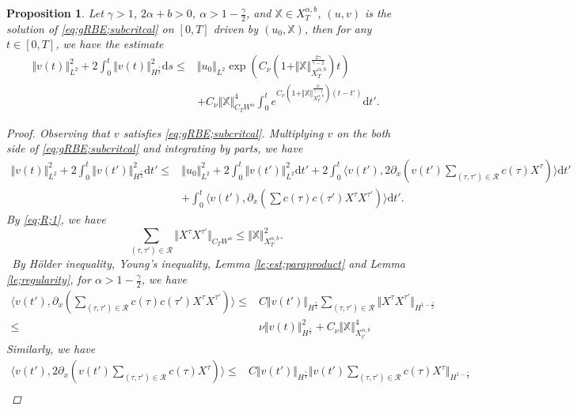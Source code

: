 \documentclass{article}
\newtheorem{proposition}{Proposition}[section]
\numberwithin{equation}{section}
\newcommand{\m}{\mathbb}
\newcommand{\ml}{\mathcal}
\newcommand{\p}{\partial}
\begin{document}
\begin{proposition}
    Let  $\gamma>1$,  $2\alpha+b>0$, $\alpha>1-\frac{\gamma}{2}$, and $\m X\in X_T^{\alpha,b} $, $(u,v)$ is the solution of \eqref{eq;gRBE;subcritcal} on $[0,T]$ driven by $(u_0,\m X)$, then for any $t\in[0,T]$, we have the estimate
\begin{align*}
    \Vert v(t)\Vert_{L^2}^2+2\int_0^t\Vert v(t)\Vert_{H^{\frac{\gamma}{2}}}^2\mathrm ds\leq& \Vert u_0\Vert_{L^2}\exp({C_\nu(1+\Vert \m X\Vert_{X_T^{\alpha,b}}^{\frac{2\gamma}{\gamma-1}})t})\\
    &+C_\nu\Vert \m X\Vert_{C_{ T}W^\alpha}^4\int_0^t e^{C_\nu(1+\Vert \m X\Vert_{X_T^{\alpha,b}}^{\frac{2\gamma}{\gamma-1}})(t-t')} \mathrm{d}t'.
\end{align*}
    \begin{proof}
        Observing that $v$ satisfies \eqref{eq;gRBE;subcritcal}. Multiplying $v$ on the both side of \eqref{eq;gRBE;subcritcal} and integrating by parts, we have
			\begin{align*}
				\Vert v(t)\Vert_{L^2}^2+2\int_0^t \Vert v(t')\Vert_{H^\frac{\gamma}{2}}^2\mathrm{d}t'\leq& \Vert u_0\Vert_{L^2}^2+2\int_0^t\Vert v(t')\Vert_{L^2}^2\mathrm{d}t'+2\int_0^t\langle v(t'),2\p_x(v(t')\sum_{(\tau,\tau')\in\ml R}c(\tau)X^\tau)\rangle\mathrm{d}t'\\
                &+\int_0^t\langle  v(t'),\p_x (\sum c(\tau)c(\tau')X^\tau X^{\tau'})\rangle\mathrm{d}t'.
			\end{align*}
		By \eqref{eq;R;1}, we have  
        \begin{equation}
            \sum_{(\tau,\tau')\in\ml R}\Vert X^\tau X^{\tau'}\Vert_{C_TW^\alpha} \leq \Vert \m X\Vert_{X_T^{\alpha,b}}^2.
        \end{equation}
        \
            By H\"older inequality, Young's inequality, Lemma \ref{le;est;paraproduct} and Lemma \ref{le;regularity},  for $\alpha>1-\frac{\gamma}{2}$, we have
			\begin{align*}
				\langle  v(t'),\p_x (\sum_{(\tau,\tau')\in\ml R} c(\tau)c(\tau')X^\tau X^{\tau'})\rangle\leq& C\Vert v(t')\Vert_{H^{\frac\gamma2}}\sum_{(\tau,\tau')\in\ml R}\Vert X^{\tau}X^{\tau'}\Vert _{H^{1-\frac\gamma 2}}\\
                \leq&\nu\Vert v(t)\Vert_{H^{\frac\gamma2}}^2+C_\nu\Vert \m X\Vert_{X_{t'}^{\alpha,b}}^4
			\end{align*}
         Similarly, we have
         \begin{align*}
             \langle v(t'),2\p_x(v(t')\sum_{(\tau,\tau')\in\ml R} c(\tau)X^\tau)\rangle\leq& C\Vert v(t')\Vert_{H^{\frac\gamma2}}\Vert v(t')\sum_{(\tau,\tau')\in\ml R} c(\tau)X^\tau\Vert_{H^{1-\frac\gamma 2}}\\

\end{align*}
\end{proof}
\end{proposition}
\end{document}
